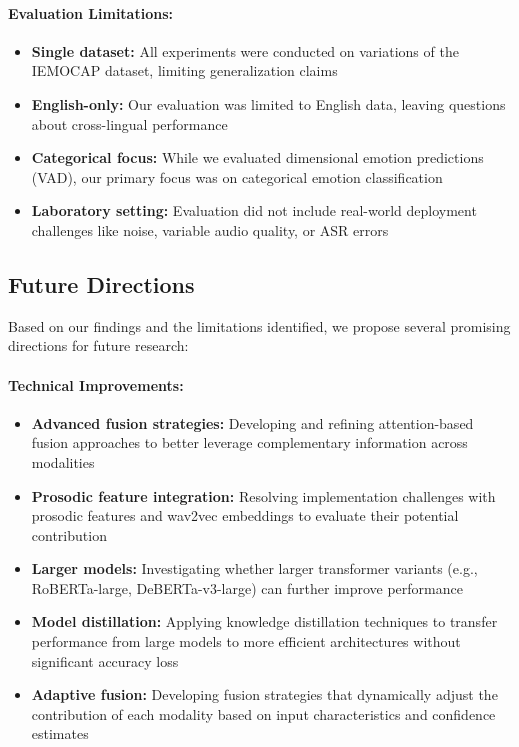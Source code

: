 \documentclass[12pt]{article}
\begin{document}
\paragraph{Evaluation Limitations:}
\begin{itemize}
    \item \textbf{Single dataset:} All experiments were conducted on variations of the IEMOCAP dataset, limiting generalization claims
    
    \item \textbf{English-only:} Our evaluation was limited to English data, leaving questions about cross-lingual performance
    
    \item \textbf{Categorical focus:} While we evaluated dimensional emotion predictions (VAD), our primary focus was on categorical emotion classification
    
    \item \textbf{Laboratory setting:} Evaluation did not include real-world deployment challenges like noise, variable audio quality, or ASR errors
\end{itemize}

\subsection{Future Directions}
Based on our findings and the limitations identified, we propose several promising directions for future research:

\paragraph{Technical Improvements:}
\begin{itemize}
    \item \textbf{Advanced fusion strategies:} Developing and refining attention-based fusion approaches to better leverage complementary information across modalities
    
    \item \textbf{Prosodic feature integration:} Resolving implementation challenges with prosodic features and wav2vec embeddings to evaluate their potential contribution
    
    \item \textbf{Larger models:} Investigating whether larger transformer variants (e.g., RoBERTa-large, DeBERTa-v3-large) can further improve performance
    
    \item \textbf{Model distillation:} Applying knowledge distillation techniques to transfer performance from large models to more efficient architectures without significant accuracy loss
    
    \item \textbf{Adaptive fusion:} Developing fusion strategies that dynamically adjust the contribution of each modality based on input characteristics and confidence estimates
\end{itemize}
\end{document}
